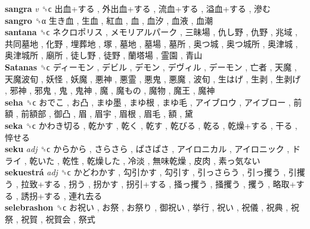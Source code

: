 \textbf{sangra} \emph{v}  ␝ϲ   出血+する ,  外出血+する ,  流血+する ,  溢血+する ,  滲む   \\
\textbf{sangro} ␝α   生き血 ,  生血 ,  紅血 ,  血 ,  血汐 ,  血液 ,  血潮   \\
\textbf{santana} ␝ϲ   ネクロポリス ,  メモリアルパーク ,  三昧場 ,  仇し野 ,  仇野 ,  兆域 ,  共同墓地 ,  化野 ,  埋葬地 ,  塚 ,  墓地 ,  墓場 ,  墓所 ,  奥つ城 ,  奥つ城所 ,  奥津城 ,  奥津城所 ,  廟所 ,  徒し野 ,  徒野 ,  蘭塔場 ,  霊園 ,  青山   \\
\textbf{Satanas} ␝ϲ   ディーモン ,  デビル ,  デモン ,  デヴィル ,  デーモン ,  亡者 ,  天魔 ,  天魔波旬 ,  妖怪 ,  妖魔 ,  悪神 ,  悪霊 ,  悪鬼 ,  悪魔 ,  波旬 ,  生はげ ,  生剥 ,  生剥げ ,  邪神 ,  邪鬼 ,  鬼 ,  鬼神 ,  魔 ,  魔もの ,  魔物 ,  魔王 ,  魔神   \\
\textbf{seha} ␝ϲ   おでこ ,  お凸 ,  まゆ墨 ,  まゆ根 ,  まゆ毛 ,  アイブロウ ,  アイブロー ,  前額 ,  前額部 ,  御凸 ,  眉 ,  眉宇 ,  眉根 ,  眉毛 ,  額 ,  黛   \\
\textbf{seka} ␝ϲ   かわき切る ,  乾かす ,  乾く ,  乾す ,  乾びる ,  乾る ,  乾燥+する ,  干る ,  悴せる   \\
\textbf{seku} \emph{adj}  ␝ϲ   からから ,  さらさら ,  ぱさぱさ ,  アイロニカル ,  アイロニック ,  ドライ ,  乾いた ,  乾性 ,  乾燥した ,  冷淡 ,  無味乾燥 ,  皮肉 ,  素っ気ない   \\
\textbf{sekuestrá} \emph{adj}  ␝ϲ   かどわかす ,  勾引かす ,  勾引す ,  引っさらう ,  引っ攫う ,  引攫う ,  拉致+する ,  拐う ,  拐かす ,  拐引+する ,  掻っ攫う ,  掻攫う ,  攫う ,  略取+する ,  誘拐+する ,  連れ去る   \\
\textbf{selebrashon} ␝ϲ   お祝い ,  お祭 ,  お祭り ,  御祝い ,  挙行 ,  祝い ,  祝儀 ,  祝典 ,  祝祭 ,  祝賀 ,  祝賀会 ,  祭式   \\
